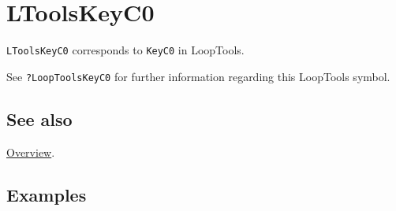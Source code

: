 \documentclass[../FeynHelpersManual.tex]{subfiles}
\begin{document}
\hypertarget{ltoolskeyc0}{
\section{LToolsKeyC0}\label{ltoolskeyc0}}

\texttt{LToolsKeyC0} corresponds to \texttt{KeyC0} in LoopTools.

See \texttt{?LoopTools\textasciigrave KeyC0} for further information
regarding this LoopTools symbol.

\subsection{See also}

\hyperlink{toc}{Overview}.

\subsection{Examples}
\end{document}
